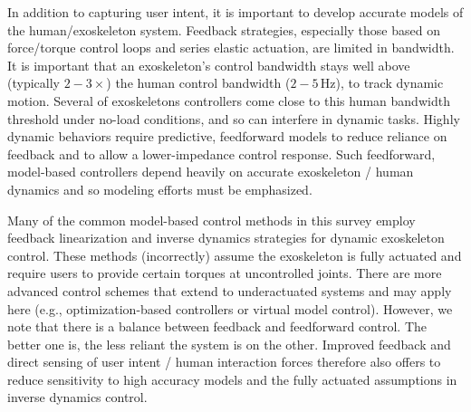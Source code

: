 \documentclass[letterpaper,12pt,fullpage]{article}
\begin{document}
In addition to capturing user intent, it is important to develop accurate models of the human/exoskeleton system.  Feedback strategies, especially those based on force/torque control loops and series elastic actuation, are limited in bandwidth. 
%
It is important that an exoskeleton's control bandwidth stays well above (typically $2-3\times$) the human control bandwidth ($2-5\,$Hz), to track dynamic motion.  Several of exoskeletons controllers come close to this human bandwidth threshold under no-load conditions, and so can interfere in dynamic tasks.
%
Highly dynamic behaviors require predictive, feedforward models to reduce reliance on feedback and to allow a lower-impedance control response.  
Such feedforward, model-based controllers depend heavily on accurate exoskeleton / human dynamics and so modeling efforts must be emphasized.

Many of the common model-based control methods in this survey employ feedback linearization and inverse dynamics strategies for dynamic exoskeleton control.  
These methods (incorrectly) assume the exoskeleton is fully actuated and require users to provide certain torques at uncontrolled joints.  There are more advanced control schemes that extend to underactuated systems and may apply here (e.g., optimization-based controllers or virtual model control).  However, we note that there is a balance between feedback and feedforward control.  The better one is, the less reliant the system is on the other.
Improved feedback and direct sensing of user intent / human interaction forces therefore also offers to reduce sensitivity to high accuracy models and the fully actuated assumptions in inverse dynamics control. 

\end{document}
